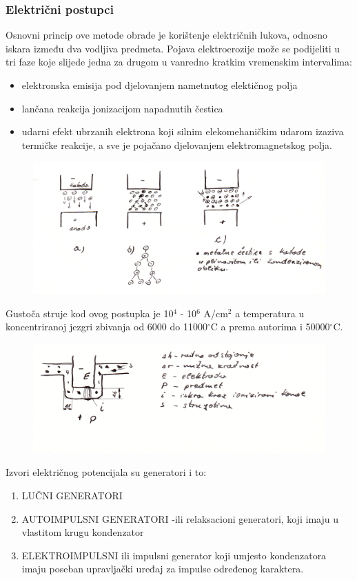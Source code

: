 \documentclass[a4paper,12pt]{article}
\numberwithin{figure}{section}
\begin{document}
\subsubsection{Električni postupci}
Osnovni princip ove metode obrade je korištenje električnih lukova, odnosno iskara između dva vodljiva predmeta. Pojava elektroerozije može se podijeliti u tri faze koje slijede jedna za drugom u vanredno kratkim vremenskim intervalima:
\begin{itemize}
\item elektronska emisija pod djelovanjem nametnutog elektičnog polja
\item lančana reakcija jonizacijom napadnutih čestica
\item udarni efekt ubrzanih elektrona koji silnim elekomehaničkim udarom izaziva termičke reakcije, a sve je pojačano djelovanjem elektromagnetskog polja.
\end{itemize}
\begin{figure}[!h]
\centering
\includegraphics[scale=0.17]{image_63-1.png}
\end{figure}
\FloatBarrier
Gustoča struje kod ovog postupka je 10$^{4}$ - 10$^{6}$ A/cm$^{2}$ a temperatura u koncentriranoj jezgri zbivanja od 6000 do 11000$^{\circ}$C a prema autorima i 50000$^{\circ}$C.\par
\begin{figure}[!h]
\centering
\includegraphics[scale=0.17]{image_63-2.png}
\end{figure}
\FloatBarrier
Izvori električnog potencijala su generatori i to:
\begin{enumerate}
\item LUČNI GENERATORI
\item AUTOIMPULSNI GENERATORI -ili relaksacioni generatori, koji imaju u vlastitom krugu kondenzator
\item ELEKTROIMPULSNI ili impulsni generator koji umjesto kondenzatora imaju poseban upravljački uređaj za impulse određenog karaktera.
\end{enumerate}
\end{document}
